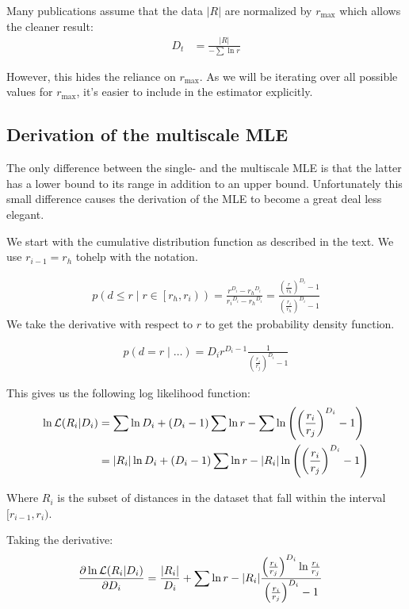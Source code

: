 \documentclass[10pt]{article}
\begin{document}
Many publications assume that the data $|R|$ are normalized by $r_{\max}$ which allows the cleaner result:
\begin{align*}
D_t &= \frac{|R|}{- \sum \ln r} 
\end{align*}

However, this hides the reliance on $r_{\max}$. As we will be iterating over all possible values for $r_{\max}$, it's easier to include in the estimator explicitly.

\subsection{Derivation of the multiscale MLE}

The only difference between the single- and the multiscale MLE is that the latter has a lower bound to its range in addition to an upper bound. Unfortunately this small difference causes the derivation of the MLE to become a great deal less elegant.

We start with the cumulative distribution function as described in the text. We use $r_{i-1} = r_h$ tohelp with the notation.

\begin{align*}
p\left(d \leq r \mid r \in \left[r_h, r_i\right)\right) = \frac{r^{D_i} - {r_h}^{D_i}}{{r_i}^{D_i} - {r_{h}}^{D_i}} = \frac{\left(\frac{r}{r_h}\right)^{D_i} - 1}{\left(\frac{r_i}{r_h}\right)^{D_i} - 1}
\end{align*}
We take the derivative with respect to $r$ to get the probability density function.

\begin{align*}
p(d = r \mid \ldots) = {D_i}r^{D_i-1} \frac{1}{\left(\frac{r_i}{r_j}\right)^{D_i} - 1}
\end{align*}

This gives us the following log likelihood function:
\begin{align*}
\ln{\cal L}(R_i|D_i) &= \sum \ln D_i + (D_i - 1)\sum \ln r - \sum \ln \left(\left(\frac{r_i}{r_j}\right)^{D_i} -1\right)\\
&=  |R_i|\ln D_i + (D_i - 1)\sum \ln r - |R_i| \ln \left(\left(\frac{r_i}{r_j}\right)^{D_i} -1\right) 
\end{align*}

Where $R_i$ is the subset of distances in the dataset that fall within the interval $[r_{i-1}, r_i)$. 

Taking the derivative:
\begin{align*}
\frac {\partial \ln{\cal L}(R_i|D_i)}{\partial D_i} &=  \frac{|R_i|}{D_i} + \sum \ln r - |R_i| \frac{\left(\frac{r_i}{r_j}\right)^{D_i} \ln \frac{r_i}{r_j}}{\left(\frac{r_i}{r_j}\right)^{D_i} -1}
\end{align*}
\end{document}
